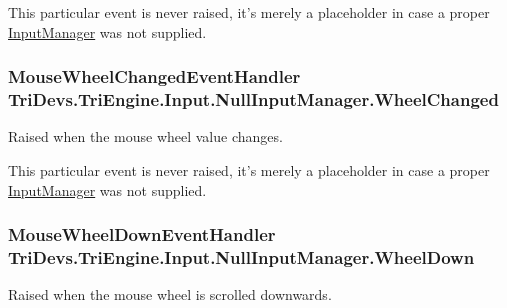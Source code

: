 This particular event is never raised, it's merely a placeholder in case a proper \hyperlink{class_tri_devs_1_1_tri_engine_1_1_input_1_1_input_manager}{Input\-Manager} was not supplied. \hypertarget{class_tri_devs_1_1_tri_engine_1_1_input_1_1_null_input_manager_a0290c88bcfd760f724d645793c4570a3}{
\subsubsection[{Wheel\-Changed}]{\setlength{\rightskip}{0pt plus 5cm}Mouse\-Wheel\-Changed\-Event\-Handler Tri\-Devs.\-Tri\-Engine.\-Input.\-Null\-Input\-Manager.\-Wheel\-Changed}}\label{class_tri_devs_1_1_tri_engine_1_1_input_1_1_null_input_manager_a0290c88bcfd760f724d645793c4570a3}


Raised when the mouse wheel value changes. 

This particular event is never raised, it's merely a placeholder in case a proper \hyperlink{class_tri_devs_1_1_tri_engine_1_1_input_1_1_input_manager}{Input\-Manager} was not supplied. \hypertarget{class_tri_devs_1_1_tri_engine_1_1_input_1_1_null_input_manager_ac5f0d69788b20286deae3915fef5accc}{
\subsubsection[{Wheel\-Down}]{\setlength{\rightskip}{0pt plus 5cm}Mouse\-Wheel\-Down\-Event\-Handler Tri\-Devs.\-Tri\-Engine.\-Input.\-Null\-Input\-Manager.\-Wheel\-Down}}\label{class_tri_devs_1_1_tri_engine_1_1_input_1_1_null_input_manager_ac5f0d69788b20286deae3915fef5accc}


Raised when the mouse wheel is scrolled downwards. 

